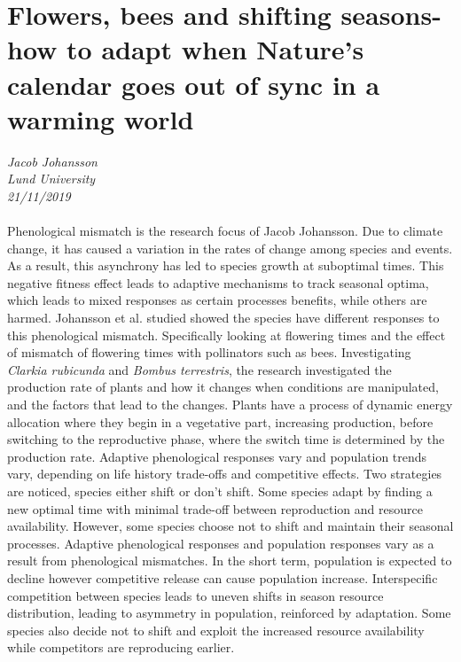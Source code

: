 \documentclass[11pt]{article}
\begin{document}
\section{Flowers, bees and shifting seasons- how to adapt when Nature’s calendar goes out of sync in a warming world}
\textit{Jacob Johansson\\Lund University\\21/11/2019}
\\
\\Phenological mismatch is the research focus of Jacob Johansson. Due to climate change, it has caused a variation in the rates of change among species and events. As a result, this asynchrony has led to species growth at suboptimal times. This negative fitness effect leads to adaptive mechanisms to track seasonal optima, which leads to mixed responses as certain processes benefits, while others are harmed. Johansson et al. studied showed the species have different responses to this phenological mismatch. Specifically looking at flowering times and the effect of mismatch of flowering times with pollinators such as bees. Investigating \textit{Clarkia rubicunda} and \textit{Bombus terrestris}, the research investigated the production rate of plants and how it changes when conditions are manipulated, and the factors that lead to the changes. Plants have a process of dynamic energy allocation where they begin in a vegetative part, increasing production, before switching to the reproductive phase, where the switch time is determined by the production rate. Adaptive phenological responses vary and population trends vary, depending on life history trade-offs and competitive effects. Two strategies are noticed, species either shift or don’t shift. Some species adapt by finding a new optimal time with minimal trade-off between reproduction and resource availability. However, some species choose not to shift and maintain their seasonal processes. Adaptive phenological responses and population responses vary as a result from phenological mismatches. In the short term, population is expected to decline however competitive release can cause population increase. Interspecific competition between species leads to uneven shifts in season resource distribution, leading to asymmetry in population, reinforced by adaptation. Some species also decide not to shift and exploit the increased resource availability while competitors are reproducing earlier.
\end{document}
